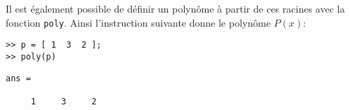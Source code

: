 Il est également possible de définir un polynôme à partir de ces racines avec 
la fonction \texttt{poly}. Ainsi l'instruction suivante donne le polynôme $P(x)$:
\begin{verbatim}
>> p = [ 1  3  2 ];
>> poly(p)
\end{verbatim}
\begin{verbatim}
ans =

     1     3     2
\end{verbatim}
\clearpage

\captionsetup{width=0.9\linewidth}
